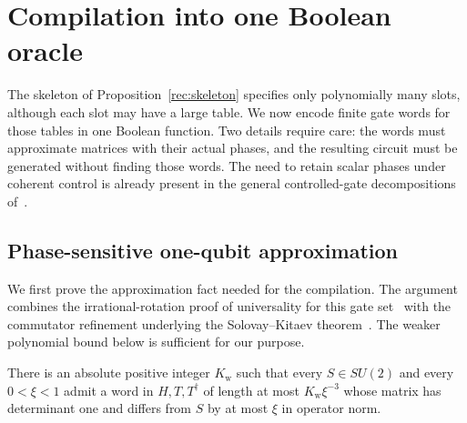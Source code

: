 \section{Compilation into one Boolean oracle}\label{sec:compilation}

The skeleton of Proposition~\ref{rec:skeleton} specifies only polynomially
many slots, although each slot may have a large table. We now encode finite
gate words for those tables in one Boolean function. Two details require
care: the words must approximate matrices with their actual phases, and the
resulting circuit must be generated without finding those words. The need to
retain scalar phases under coherent control is already present in the general
controlled-gate decompositions of~\cite{Barenco1995}.

\subsection{Phase-sensitive one-qubit approximation}

We first prove the approximation fact needed for the compilation. The
argument combines the irrational-rotation proof of universality for this
gate set~\cite{Boykin2000} with the commutator refinement underlying the
Solovay--Kitaev theorem~\cite{DN2006}. The weaker polynomial bound below is
sufficient for our purpose.

\begin{lemma}\label{compile:words}
There is an absolute positive integer $K_{\mathrm w}$ such that every $S\in SU(2)$ and every
$0<\xi<1$ admit a word in $H,T,T^\dagger$ of length at most $K_{\mathrm w}\xi^{-3}$
whose matrix has determinant one and differs from $S$ by at most $\xi$ in
operator norm.
\end{lemma}

